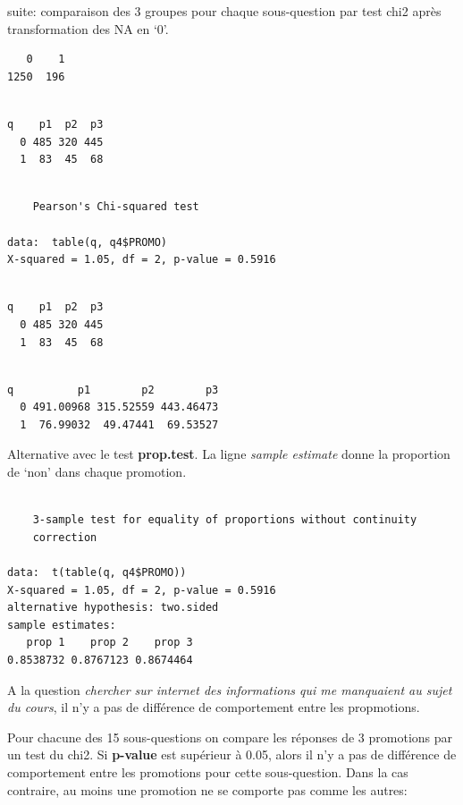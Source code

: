 \documentclass[]{article}
\begin{document}
suite: comparaison des 3 groupes pour chaque sous-question par test chi2
après transformation des NA en `0'.

\begin{verbatim}
   0    1 
1250  196 
\end{verbatim}

\begin{verbatim}
   
q    p1  p2  p3
  0 485 320 445
  1  83  45  68
\end{verbatim}

\begin{verbatim}

    Pearson's Chi-squared test

data:  table(q, q4$PROMO)
X-squared = 1.05, df = 2, p-value = 0.5916
\end{verbatim}

\begin{verbatim}
   
q    p1  p2  p3
  0 485 320 445
  1  83  45  68
\end{verbatim}

\begin{verbatim}
   
q          p1        p2        p3
  0 491.00968 315.52559 443.46473
  1  76.99032  49.47441  69.53527
\end{verbatim}

Alternative avec le test \textbf{prop.test}. La ligne \emph{sample
estimate} donne la proportion de `non' dans chaque promotion.

\begin{verbatim}

    3-sample test for equality of proportions without continuity
    correction

data:  t(table(q, q4$PROMO))
X-squared = 1.05, df = 2, p-value = 0.5916
alternative hypothesis: two.sided
sample estimates:
   prop 1    prop 2    prop 3 
0.8538732 0.8767123 0.8674464 
\end{verbatim}

A la question \emph{chercher sur internet des informations qui me
manquaient au sujet du cours}, il n'y a pas de différence de
comportement entre les propmotions.

Pour chacune des 15 sous-questions on compare les réponses de 3
promotions par un test du chi2. Si \textbf{p-value} est supérieur à
0.05, alors il n'y a pas de différence de comportement entre les
promotions pour cette sous-question. Dans la cas contraire, au moins une
promotion ne se comporte pas comme les autres:
\end{document}
